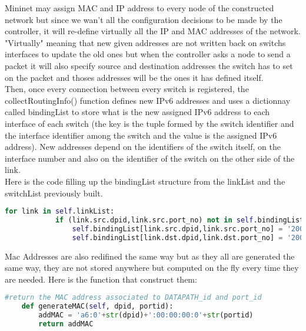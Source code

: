\documentclass{article}
\begin{document}
Mininet may assign MAC and IP address to every node of the constructed
network but since we wan't all the configuration decisions to be made
by the controller, it will re-define virtually all the IP and MAC
addresses of the network. "Virtually" meaning that new given addresses
are not written back on switchs interfaces to update the old ones but
when the controller asks a node to send a packet it will also specify
source and destination addresses the switch has to set on the packet
and thoses addresses will be the ones it has defined itself.\\
\newline
Then, once every connection between every switch is registered, the
collectRoutingInfo() function defines new IPv6 addresses and uses a
dictionnay called bindingList to store what is the new assigned IPv6
address to each interface of each switch (the key is the tuple formed
by the switch identifier and the interface identifier among the switch
and the value is the assigned IPv6 address). New addresses depend on
the identifiers of the switch itself, on the interface number and also
on the identifier of the switch on the other side of the link.\\
\newline
Here is the code filling up the bindingList structure from the linkList
and the switchList previously built.

\begin{lstlisting}[frame=single,language=Python] 
        for link in self.linkList:
            if (link.src.dpid,link.src.port_no) not in self.bindingList and (link.dst.dpid,link.dst.port_no) not in self.bindingList :
                self.bindingList[link.src.dpid,link.src.port_no] = '2000:'+str(link.src.dpid)+str(link.dst.dpid)+'::'+str(link.src.dpid)
                self.bindingList[link.dst.dpid,link.dst.port_no] = '2000:'+str(link.src.dpid)+str(link.dst.dpid)+'::'+str(link.dst.dpid)
\end{lstlisting}

Mac Addresses are also redifined the same way but as they all are
generated the same way, they are not stored anywhere but computed on
the fly every time they are needed. Here is the function that
construct them:

\begin{lstlisting}[frame=single,language=Python] 
    #return the MAC address associated to DATAPATH_id and port_id
    def generateMAC(self, dpid, portid):
        addMAC = 'a6:0'+str(dpid)+':00:00:00:0'+str(portid)
        return addMAC
\end{lstlisting}
\end{document}
